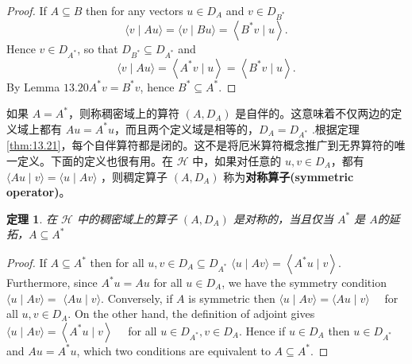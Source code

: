 \documentclass[hyperref,UTF8]{ctexbook}
\newtheorem{theorem}{定理}[chapter]
\begin{document}
\begin{proof}

If \(A \subseteq B\) then for any vectors \(u \in D_{A}\) and \(v \in D_{B^{*}}\)
\[
\langle v \mid A u\rangle=\langle v \mid B u\rangle=\left\langle B^{*} v \mid u\right\rangle .
\]
Hence \(v \in D_{A^{*}}\), so that \(D_{B^{*}} \subseteq D_{A^{*}}\) and
\[
\langle v \mid A u\rangle=\left\langle A^{*} v \mid u\right\rangle=\left\langle B^{*} v \mid u\right\rangle .
\]
By Lemma \(13.20 A^{*} v=B^{*} v\), hence \(B^{*} \subseteq A^{*}\).
    
\end{proof}
如果 \(A=A^{*}\)，则称稠密域上的算符 \(\left(A, D_{A}\right)\) 是自伴的。这意味着不仅两边的定义域上都有 \(A u=A^{*} u\)，而且两个定义域是相等的，\(D_{A}=D_{A^{*}}\) .根据定理 \ref{thm:13.21}，每个自伴算符都是闭的。这不是将厄米算符概念推广到无界算符的唯一定义。下面的定义也很有用。在 \(\mathcal{H}\) 中，如果对任意的 \(u, v \in D_{A}\)，都有 \(\langle A u \mid v\rangle=\langle u \mid A v\rangle\) ，则稠定算子 \(\left(A, D_{A}\right)\) 称为\textbf{对称算子(symmetric operator)}。
\begin{theorem}
    在 \(\mathcal{H}\) 中的稠密域上的算子 \(\left(A, D_{A}\right)\) 是对称的，当且仅当 \(A^{*}\) 是 \(A\)的延拓，\(A \subseteq A^{*}\) \label{thm:13.23}
\end{theorem}
\begin{proof}
If \(A \subseteq A^{*}\) then for all \(u, v \in D_{A} \subseteq D_{A^{*}}\)
\(\langle u \mid A v\rangle=\left\langle A^{*} u \mid v\right\rangle .\)
Furthermore, since \(A^{*} u=A u\) for all \(u \in D_{A}\), we have the symmetry condition \(\langle u \mid A v\rangle=\)
\(\langle A u \mid v\rangle\).
Conversely, if \(A\) is symmetric then
\(\langle u \mid A v\rangle=\langle A u \mid v\rangle \quad\) for all \(u, v \in D_{A} .\)
On the other hand, the definition of adjoint gives
\(\langle u \mid A v\rangle=\left\langle A^{*} u \mid v\right\rangle \quad\) for all \(u \in D_{A^{*}}, v \in D_{A}\).
Hence if \(u \in D_{A}\) then \(u \in D_{A^{*}}\) and \(A u=A^{*} u\), which two conditions are equivalent to
\(A \subseteq A^{*}\).
\end{proof}
\end{document}
